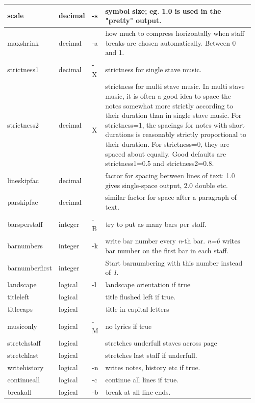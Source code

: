 \documentclass[a4paper]{article}
\begin{document}
\begin{center}
\begin{longtable}{|l|l|p{1.8cm}|p{7.2cm}|}
scale  & decimal & -s & 
	symbol size; eg. 1.0 is used in the "pretty" output. \\ \hline
maxshrink & decimal & -a &
	how much to compress horizontally when staff breaks
	are chosen automatically. Between 0 and 1. \\ \hline
strictness1 & decimal & -X &
	strictness for single stave music. \\ \hline
strictness2 & decimal & -X &
	strictness for multi stave music. \newline
	In multi stave music, it is often a good idea to space the notes 
	somewhat more strictly according to their duration than in 
	single stave music. For strictness=1, the spacings for notes
	with short durations is reasonably strictly proportional to
	their duration. For strictness=0, they are spaced about
	equally. Good defaults are strictness1=0.5 and strictness2=0.8. \\ \hline
lineskipfac & decimal & & 
	factor for spacing between lines of text:
	1.0 gives single-space output, 2.0 double etc. \\ \hline
parskipfac & decimal & &  
	similar factor for space after a paragraph of text. \\ \hline
barsperstaff & integer & -B &  
	try to put as many bars per staff. \\ \hline
barnumbers & integer & -k &  
	write bar number every {\it n}-th bar. {\it n=0} writes
    bar number on the first bar in each staff. \\ \hline
barnumberfirst & integer & &  
	Start barnumbering with this number instead of {\it 1}. \\ \hline
landscape & logical & -l & 
	landscape orientation if true \\ \hline
titleleft & logical & & 
	title flushed left if true. \\ \hline
titlecaps & logical & & 
	title in capital letters \\ \hline
musiconly & logical & -M & 
	no lyrics if true \\ \hline
stretchstaff & logical & & 
	stretches underfull staves across page \\ \hline
stretchlast & logical & & 
	stretches last staff if underfull. \\ \hline
writehistory & logical & -n & 
	writes notes, history etc if true. \\ \hline
continueall & logical & -c & 
	continue all lines if true. \\ \hline
breakall & logical & -b & 
	break at all line ends. \\ \hline

\end{longtable}
\end{center}
\end{document}
